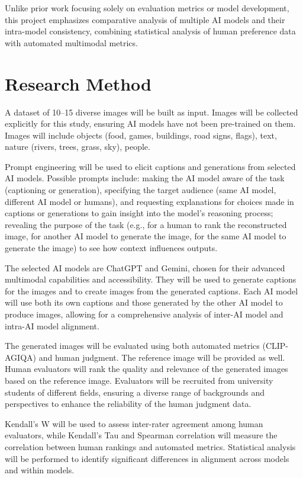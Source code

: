 \documentclass[10pt,a4paper]{article}
\begin{document}
Unlike prior work focusing solely on evaluation metrics or model development, this project emphasizes comparative analysis of multiple AI models and their intra-model consistency, combining statistical analysis of human preference data with automated multimodal metrics.


\section*{Research Method}

A dataset of 10--15 diverse images will be built as input. Images will be collected explicitly for this study, ensuring AI models have not been pre-trained on them. 
Images will include objects (food, games, buildings, road signs, flags), text, nature (rivers, trees, grass, sky), people. 

Prompt engineering will be used to elicit captions and generations from selected AI models. 
Possible prompts include: making the AI model aware of the task (captioning or generation), specifying the target audience (same AI model, different AI model or humans), and requesting explanations for choices made in captions or generations to gain insight into the model's reasoning process; revealing the purpose of the task (e.g., for a human to rank the reconstructed image, for another AI model to generate the image, for the same AI model to generate the image) to see how context influences outputs.

The selected AI models are ChatGPT and Gemini, chosen for their advanced multimodal capabilities and accessibility. 
They will be used to generate captions for the images and to create images from the generated captions. 
Each AI model will use both its own captions and those generated by the other AI model to produce images, allowing for a comprehensive analysis of inter-AI model and intra-AI model alignment.

The generated images will be evaluated using both automated metrics (CLIP-AGIQA) and human judgment. 
The reference image will be provided as well. Human evaluators will rank the quality and relevance of the generated images based on the reference image.
Evaluators will be recruited from university students of different fields, ensuring a diverse range of backgrounds and perspectives to enhance the reliability of the human judgment data.

Kendall's W will be used to assess inter-rater agreement among human evaluators, while Kendall’s Tau and Spearman correlation will measure the correlation between human rankings and automated metrics.
Statistical analysis will be performed to identify significant differences in alignment across models and within models.
\end{document}

